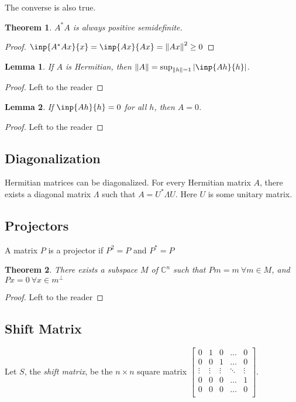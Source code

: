 \documentclass[twofold]{article}
\newcommand*\adj[1]{#1^*}
\newcommand*\norm[1]{\left \Vert #1 \right\Vert}
\newcommand*\abs[1]{\left \vert #1 \right\vert}
\theoremstyle{plain}
\newtheorem{theorem}{Theorem}
\newtheorem*{lemma}{Lemma}
\theoremstyle{definition}
\begin{document}
The converse is also true.
\begin{theorem} \(\adj{A} A\) is always positive semidefinite. \end{theorem}

\begin{proof} \(\inp{\adj{A} A x}{ x} = \inp{Ax}{Ax} = \norm{Ax}^2 \ge 0\)\end{proof}


\begin{lemma} If \(A\) is Hermitian, then \(\norm{A} = \sup_{\norm{h} = 1} \abs{\inp{Ah}{h}}\).\end{lemma}
\begin{proof} Left to the reader \end{proof}


\begin{lemma} If \(\inp{Ah}{h} = 0\) for all \(h\), then \(A = 0\).\end{lemma}
\begin{proof} Left to the reader \end{proof}


\subsection{Diagonalization}

Hermitian matrices can be diagonalized. For every Hermitian matrix \(A\), there exists a diagonal matrix \(\Lambda\) such that \(A = \adj{U}  \Lambda U\). Here \(U\) is some unitary matrix. 


\subsection{Projectors}
A matrix \(P\) is a projector if \(P^2 = P\) and \(\adj{P} = P\)

\begin{theorem} There exists a subspace \(M\) of \(\mathbb{C}^n\) such that \(Pm = m \ \forall m \in M\), and \(P x = 0 \ \forall x \in m^\perp\) \end{theorem}
\begin{proof} Left to the reader \end{proof}

\subsection{Shift Matrix}
Let \(S\), the {\em shift matrix},  be the \(n \times n\) square matrix \( \begin{bmatrix} 
0 & 1 & 0 & \ldots & 0 \\
0 & 0 & 1 & \ldots & 0 \\
\vdots & \vdots & \vdots &\ddots & \vdots \\
0 & 0 & 0 &\ldots & 1 \\
0 & 0 & 0 & \ldots & 0 \\ 
\end{bmatrix}\). 
\end{document}

